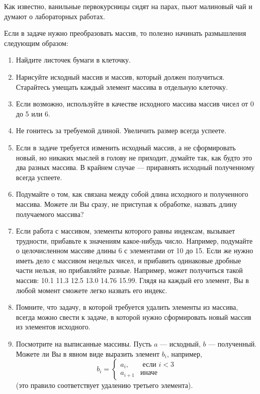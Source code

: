\begin{notbadadvice}
	\label{NA_how-to-think-about-arrays}

	Как известно, ванильные первокурсницы сидят на парах, пьют малиновый чай и думают о лабораторных работах.

	Если в задаче нужно преобразовать массив, то полезно начинать размышления следующим образом:
	\begin{enumerate}
		\item
			Найдите листочек бумаги в клеточку.
		\item
			Нарисуйте исходный массив и массив, который должен получиться.
			Старайтесь умещать каждый элемент массива в отдельную клеточку.
		\item
			Если возможно, используйте в качестве исходного массива массив чисел от 0 до 5 или 6.
		\item
			Не гонитесь за требуемой длиной.
			Увеличить размер всегда успеете.
		\item
			Если в задаче требуется изменить исходный массив, а не сформировать новый,
			но никаких мыслей в голову не приходит, думайте так, как будто это два разных массива.
			В крайнем случае --- приравнять исходный полученному всегда успеете.
		\item
			Подумайте о том, как связана между собой длина исходного и полученного массива.
			Можете ли Вы сразу, не приступая к обработке, назвать длину получаемого массива?
		\item
			Если работа с массивом, элементы которого равны индексам, вызывает трудности,
			прибавьте к значениям какое-нибудь число.
			Например, подумайте о целочисленном массиве длины 6 с элементами от 10 до 15.
			Если же нужно иметь дело с массивом нецелых чисел, и прибавить одинаковые дробные части нельзя,
			но прибавляйте разные.
			Например, может получиться такой массив: 10.1 11.3 12.5 13.0 14.76 15.99.
			Глядя на каждый его элемент, Вы в любой момент сможете легко назвать его индекс.
		\item
			Помните, что задачу, в которой требуется удалить элементы из массива, всегда можно свести к задаче,
			в которой нужно сформировать новый массив из элементов исходного.
		\item
			Посмотрите на выписанные массивы.
			Пусть $a$ --- исходный, $b$ --- полученный.
			Можете ли Вы в явном виде выразить элемент $b_i$, например,
			$$
				b_i = \left\{\begin{array}{ll}
					a_i,    & \mbox{ если } i<3 \\
					a_{i+1} & \mbox{иначе}
				\end{array}\right.
			$$
			(это правило соответствует удалению третьего элемента).
	\end{enumerate}
\end{notbadadvice}
